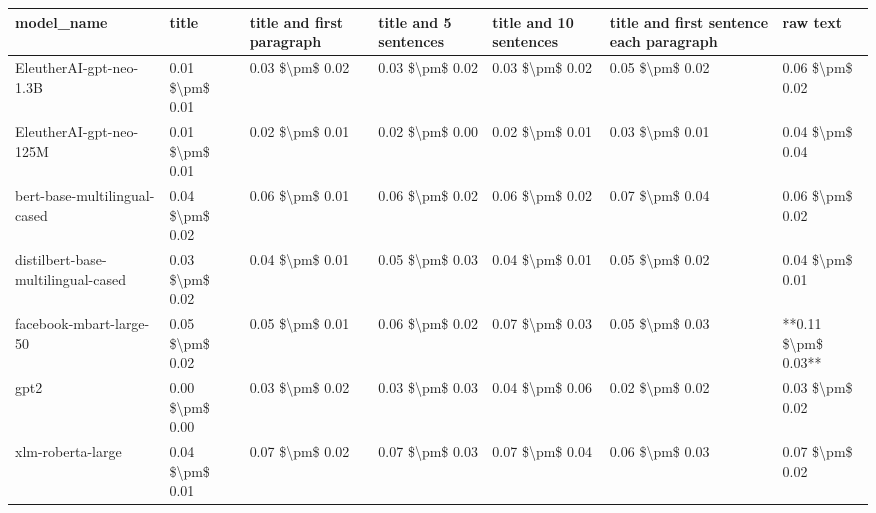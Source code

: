 \begin{tabular}{lllllll}
\toprule
                        model\_name &           title & title and first paragraph & title and 5 sentences & title and 10 sentences & title and first sentence each paragraph &            raw text \\
\midrule
           EleutherAI-gpt-neo-1.3B & 0.01 \$\textbackslash pm\$ 0.01 &           0.03 \$\textbackslash pm\$ 0.02 &       0.03 \$\textbackslash pm\$ 0.02 &        0.03 \$\textbackslash pm\$ 0.02 &                         0.05 \$\textbackslash pm\$ 0.02 &     0.06 \$\textbackslash pm\$ 0.02 \\
           EleutherAI-gpt-neo-125M & 0.01 \$\textbackslash pm\$ 0.01 &           0.02 \$\textbackslash pm\$ 0.01 &       0.02 \$\textbackslash pm\$ 0.00 &        0.02 \$\textbackslash pm\$ 0.01 &                         0.03 \$\textbackslash pm\$ 0.01 &     0.04 \$\textbackslash pm\$ 0.04 \\
      bert-base-multilingual-cased & 0.04 \$\textbackslash pm\$ 0.02 &           0.06 \$\textbackslash pm\$ 0.01 &       0.06 \$\textbackslash pm\$ 0.02 &        0.06 \$\textbackslash pm\$ 0.02 &                         0.07 \$\textbackslash pm\$ 0.04 &     0.06 \$\textbackslash pm\$ 0.02 \\
distilbert-base-multilingual-cased & 0.03 \$\textbackslash pm\$ 0.02 &           0.04 \$\textbackslash pm\$ 0.01 &       0.05 \$\textbackslash pm\$ 0.03 &        0.04 \$\textbackslash pm\$ 0.01 &                         0.05 \$\textbackslash pm\$ 0.02 &     0.04 \$\textbackslash pm\$ 0.01 \\
           facebook-mbart-large-50 & 0.05 \$\textbackslash pm\$ 0.02 &           0.05 \$\textbackslash pm\$ 0.01 &       0.06 \$\textbackslash pm\$ 0.02 &        0.07 \$\textbackslash pm\$ 0.03 &                         0.05 \$\textbackslash pm\$ 0.03 & **0.11 \$\textbackslash pm\$ 0.03** \\
                              gpt2 & 0.00 \$\textbackslash pm\$ 0.00 &           0.03 \$\textbackslash pm\$ 0.02 &       0.03 \$\textbackslash pm\$ 0.03 &        0.04 \$\textbackslash pm\$ 0.06 &                         0.02 \$\textbackslash pm\$ 0.02 &     0.03 \$\textbackslash pm\$ 0.02 \\
                 xlm-roberta-large & 0.04 \$\textbackslash pm\$ 0.01 &           0.07 \$\textbackslash pm\$ 0.02 &       0.07 \$\textbackslash pm\$ 0.03 &        0.07 \$\textbackslash pm\$ 0.04 &                         0.06 \$\textbackslash pm\$ 0.03 &     0.07 \$\textbackslash pm\$ 0.02 \\
\bottomrule
\end{tabular}
